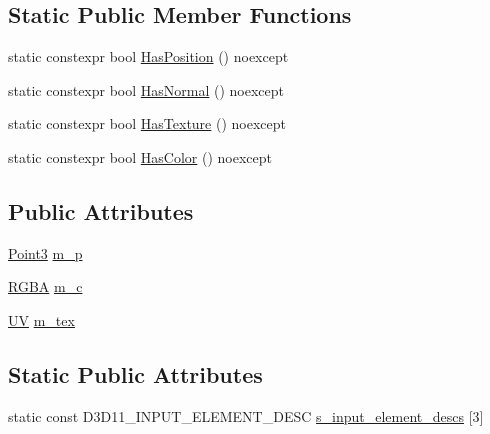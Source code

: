 \subsection*{Static Public Member Functions}
\begin{DoxyCompactItemize}
\item 
static constexpr bool \mbox{\hyperlink{structmage_1_1rendering_1_1_vertex_position_color_texture_a7e63de3d06cc4d0a9fb3f32cde764c9c}{Has\+Position}} () noexcept
\item 
static constexpr bool \mbox{\hyperlink{structmage_1_1rendering_1_1_vertex_position_color_texture_a3823f3163d8350e4c448e99e90cc9436}{Has\+Normal}} () noexcept
\item 
static constexpr bool \mbox{\hyperlink{structmage_1_1rendering_1_1_vertex_position_color_texture_a679323396203b9b47a6ef4c936c72d58}{Has\+Texture}} () noexcept
\item 
static constexpr bool \mbox{\hyperlink{structmage_1_1rendering_1_1_vertex_position_color_texture_a1d3db6f6fb5a93ce596e7157fc204f81}{Has\+Color}} () noexcept
\end{DoxyCompactItemize}
\subsection*{Public Attributes}
\begin{DoxyCompactItemize}
\item 
\mbox{\hyperlink{structmage_1_1_point3}{Point3}} \mbox{\hyperlink{structmage_1_1rendering_1_1_vertex_position_color_texture_a924a25377182f6c29ff7f50fba08113c}{m\+\_\+p}}
\item 
\mbox{\hyperlink{structmage_1_1_r_g_b_a}{R\+G\+BA}} \mbox{\hyperlink{structmage_1_1rendering_1_1_vertex_position_color_texture_acf8f36b78e8366edff1b476e2e97fec5}{m\+\_\+c}}
\item 
\mbox{\hyperlink{structmage_1_1_u_v}{UV}} \mbox{\hyperlink{structmage_1_1rendering_1_1_vertex_position_color_texture_a48cb88cc9c5d68350249e192152a7104}{m\+\_\+tex}}
\end{DoxyCompactItemize}
\subsection*{Static Public Attributes}
\begin{DoxyCompactItemize}
\item 
static const D3\+D11\+\_\+\+I\+N\+P\+U\+T\+\_\+\+E\+L\+E\+M\+E\+N\+T\+\_\+\+D\+E\+SC \mbox{\hyperlink{structmage_1_1rendering_1_1_vertex_position_color_texture_ac80470d80eea7ac62649bc9adb10ae07}{s\+\_\+input\+\_\+element\+\_\+descs}} \mbox{[}3\mbox{]}
\end{DoxyCompactItemize}


